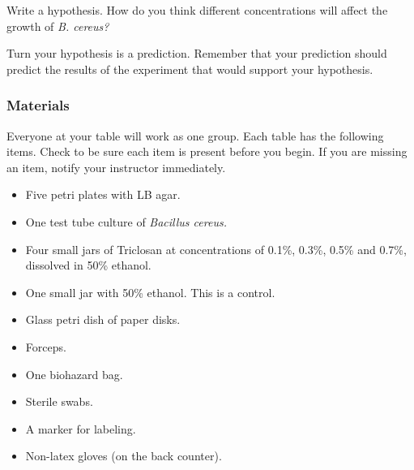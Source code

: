 \documentclass[12pt]{exam}
\begin{document}
\begin{questions}

\question \label{ques:hypothesis}
Write a hypothesis. How do you think different concentrations will affect the growth of \textit{B. cereus?}

\newpage

\question
Turn your hypothesis is a prediction. Remember that your prediction should predict the results of the experiment that would support your hypothesis. 

\vspace*{3\baselineskip}

\subsubsection*{Materials}

Everyone at your table will work as one group. Each table has the following items. Check to be sure each item is present before you begin. If you are missing an item, notify your instructor immediately.

\begin{itemize}

	\item Five petri plates with LB agar.
	
	\item One test tube culture of \textit{Bacillus cereus.}
	
	\item Four small jars of Triclosan at concentrations of 0.1\%, 0.3\%, 0.5\% and 0.7\%, dissolved in 50\% ethanol.%
	
	\item One small jar with 50\% ethanol. This is a control.

	\item Glass petri dish of paper disks.
	
	\item Forceps.
	
	\item One biohazard bag.
	
	\item Sterile swabs.
	
	\item A marker for labeling.
	
	\item Non-latex gloves (on the back counter).
	

\end{itemize}
\end{questions}
\end{document}
